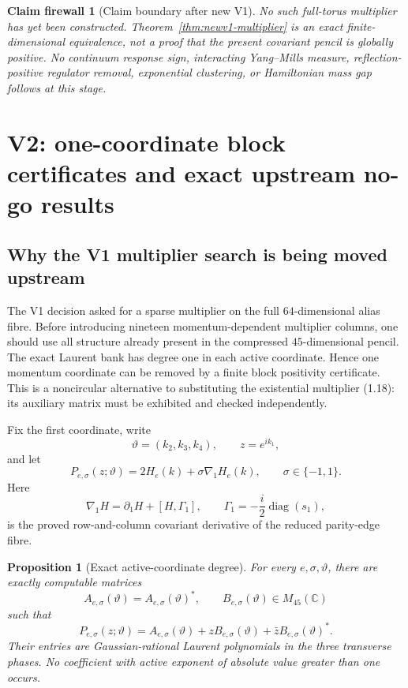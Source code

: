 \documentclass[11pt,oneside]{article}
\newtheorem{proposition}[theorem]{Proposition}
\newtheorem{firewall}[theorem]{Claim firewall}
\theoremstyle{definition}
\theoremstyle{remark}
\begin{document}
\begin{firewall}[Claim boundary after new V1]
\label{fire:newv1-final}
No such full-torus multiplier has yet been constructed.
Theorem~\ref{thm:newv1-multiplier} is an exact finite-dimensional
equivalence, not a proof that the present covariant pencil is
globally positive.  No continuum response sign, interacting
Yang--Mills measure, reflection-positive regulator removal,
exponential clustering, or Hamiltonian mass gap follows at this
stage.
\end{firewall}

\section{V2: one-coordinate block certificates and exact upstream no-go results}
\label{sec:newv2-block}

\subsection{Why the V1 multiplier search is being moved upstream}

The V1 decision asked for a sparse multiplier on the full
\(64\)-dimensional alias fibre.  Before introducing nineteen
momentum-dependent multiplier columns, one should use all structure
already present in the compressed \(45\)-dimensional pencil.  The
exact Laurent bank has degree one in each active coordinate.  Hence
one momentum coordinate can be removed by a finite block
positivity certificate.  This is a noncircular alternative to
substituting the existential multiplier (1.18): its auxiliary
matrix must be exhibited and checked independently.

Fix the first coordinate, write
\[
 \vartheta=(k_2,k_3,k_4),\qquad z=e^{ik_1},
\]
and let
\[
 P_{e,\sigma}(z;\vartheta)
 =2H_e(k)+\sigma\nabla_1H_e(k),\qquad \sigma\in\{-1,1\}.   \tag{2.1}
\]
Here
\[
 \nabla_1H=\partial_1H+[H,\Gamma_1],
 \qquad
 \Gamma_1=-\frac{i}{2}\operatorname{diag}(s_1),           \tag{2.2}
\]
is the proved row-and-column covariant derivative of the reduced
parity-edge fibre.

\begin{proposition}[Exact active-coordinate degree]
\label{prop:newv2-degree}
For every \(e,\sigma,\vartheta\), there are exactly computable
matrices
\[
 A_{e,\sigma}(\vartheta)=A_{e,\sigma}(\vartheta)^*,
 \qquad B_{e,\sigma}(\vartheta)\in M_{45}(\mathbb C)
\]
such that
\[
 P_{e,\sigma}(z;\vartheta)
 =A_{e,\sigma}(\vartheta)
  +zB_{e,\sigma}(\vartheta)
  +\bar zB_{e,\sigma}(\vartheta)^*.                       \tag{2.3}
\]
Their entries are Gaussian-rational Laurent polynomials in the
three transverse phases.  No coefficient with active exponent of
absolute value greater than one occurs.
\end{proposition}
\end{document}
